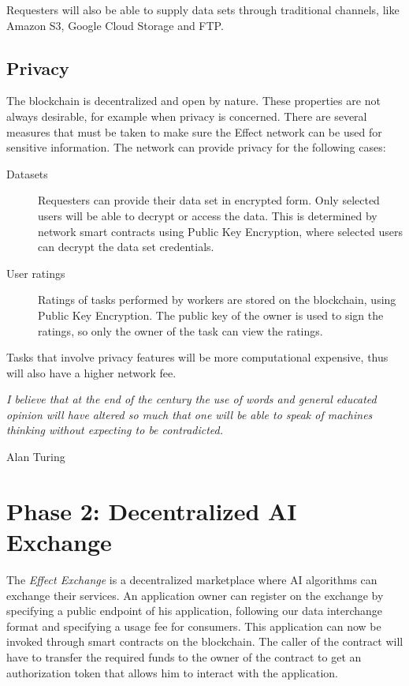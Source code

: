 \documentclass{article}
\begin{document}
Requesters will also be able to supply data sets through traditional
channels, like Amazon S3, Google Cloud Storage and FTP.

\subsection{Privacy}
The blockchain is decentralized and open by nature. These properties
are not always desirable, for example when privacy is concerned. 
There are several
measures that must be taken to make sure the Effect network can be
used for sensitive information. The network can provide privacy for
the following cases:

\begin{description}
\item[Datasets] Requesters can provide their data set in encrypted
  form. Only selected users will be able to decrypt or access the
  data. This is determined by network smart contracts using Public Key
  Encryption, where selected users can decrypt the data set
  credentials.
\item[User ratings] Ratings of tasks performed by workers are stored
  on the blockchain, using Public Key Encryption. The public key of
  the owner is used to sign the ratings, so only the owner of the task
  can view the ratings.
\end{description}

Tasks that involve privacy features will be more computational
expensive, thus will also have a higher network fee.

\newpage
\epigraph{\textit{I believe that at the end of the century the use of words and general educated opinion will have altered so much that one will be able to speak of machines thinking without expecting to be contradicted.}}{Alan Turing} 
\section{Phase 2: Decentralized AI Exchange}
\label{sec:phase2}

The \emph{Effect Exchange} is a decentralized marketplace where
AI algorithms can exchange their services. An application owner can
register on the exchange by specifying a public endpoint of his
application, following our data interchange format and specifying a
usage fee for consumers. This application can now be invoked through
smart contracts on the blockchain. The caller of the contract will
have to transfer the required funds to the owner of the contract to
get an authorization token that allows him to interact with the application.
\end{document}
